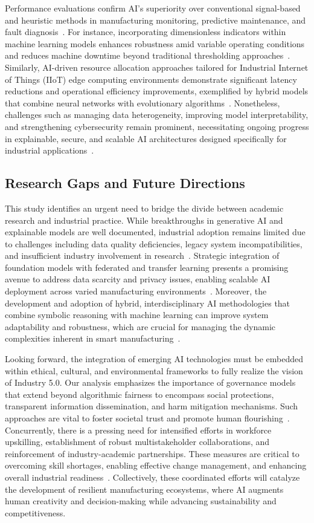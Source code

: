 \documentclass[sigconf]{acmart}
\begin{document}
Performance evaluations confirm AI's superiority over conventional signal-based and heuristic methods in manufacturing monitoring, predictive maintenance, and fault diagnosis~\cite{ref4,ref24,ref32}. For instance, incorporating dimensionless indicators within machine learning models enhances robustness amid variable operating conditions and reduces machine downtime beyond traditional thresholding approaches~\cite{ref4}. Similarly, AI-driven resource allocation approaches tailored for Industrial Internet of Things (IIoT) edge computing environments demonstrate significant latency reductions and operational efficiency improvements, exemplified by hybrid models that combine neural networks with evolutionary algorithms~\cite{ref31,ref34}. Nonetheless, challenges such as managing data heterogeneity, improving model interpretability, and strengthening cybersecurity remain prominent, necessitating ongoing progress in explainable, secure, and scalable AI architectures designed specifically for industrial applications~\cite{ref29,ref35,ref39}.

\subsection{Research Gaps and Future Directions}

This study identifies an urgent need to bridge the divide between academic research and industrial practice. While breakthroughs in generative AI and explainable models are well documented, industrial adoption remains limited due to challenges including data quality deficiencies, legacy system incompatibilities, and insufficient industry involvement in research~\cite{ref3,ref7}. Strategic integration of foundation models with federated and transfer learning presents a promising avenue to address data scarcity and privacy issues, enabling scalable AI deployment across varied manufacturing environments~\cite{ref5,ref8}. Moreover, the development and adoption of hybrid, interdisciplinary AI methodologies that combine symbolic reasoning with machine learning can improve system adaptability and robustness, which are crucial for managing the dynamic complexities inherent in smart manufacturing~\cite{ref35,ref37}.

Looking forward, the integration of emerging AI technologies must be embedded within ethical, cultural, and environmental frameworks to fully realize the vision of Industry 5.0. Our analysis emphasizes the importance of governance models that extend beyond algorithmic fairness to encompass social protections, transparent information dissemination, and harm mitigation mechanisms. Such approaches are vital to foster societal trust and promote human flourishing~\cite{ref25}. Concurrently, there is a pressing need for intensified efforts in workforce upskilling, establishment of robust multistakeholder collaborations, and reinforcement of industry-academic partnerships. These measures are critical to overcoming skill shortages, enabling effective change management, and enhancing overall industrial readiness~\cite{ref2,ref3,ref21}. Collectively, these coordinated efforts will catalyze the development of resilient manufacturing ecosystems, where AI augments human creativity and decision-making while advancing sustainability and competitiveness.
\end{document}
